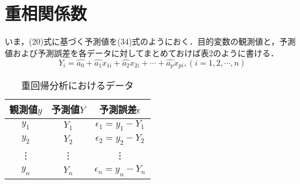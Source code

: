 \documentclass[dvipdfmx]{jsarticle}
\begin{document}
\section{重相関係数}
いま，(20)式に基づく予測値を(34)式のようにおく．目的変数の観測値と，予測値および予測誤差を各データに対してまとめておけば表2のように書ける．
\begin{equation}
  Y_i = \hat{a_0}+\hat{a_1}x_{1i}+\hat{a_2}x_{2i}+\cdots+\hat{a_p}x_{pi}, (i=1,2,\cdots,n)
\end{equation}
\begin{table}[htb]
  \begin{center}
    \caption{重回帰分析におけるデータ}
    \begin{tabular}{|c|c|c|}
      \hline
      \rowcolor[rgb]{1.0, 0.8, 0.5}
      観測値$y$ & 予測値$Y$ & 予測誤差$\epsilon$   \\
      \hline
      $y_1$     & $Y_1$     & $\epsilon_1=y_1-Y_1$ \\
      \hline
      $y_2$     & $Y_2$     & $\epsilon_2=y_2-Y_2$ \\
      \hline
      \vdots    & \vdots    & \vdots               \\
      \hline
      $y_n$     & $Y_n$     & $\epsilon_n=y_n-Y_n$ \\
      \hline
    \end{tabular}
  \end{center}
\end{table}
\end{document}
